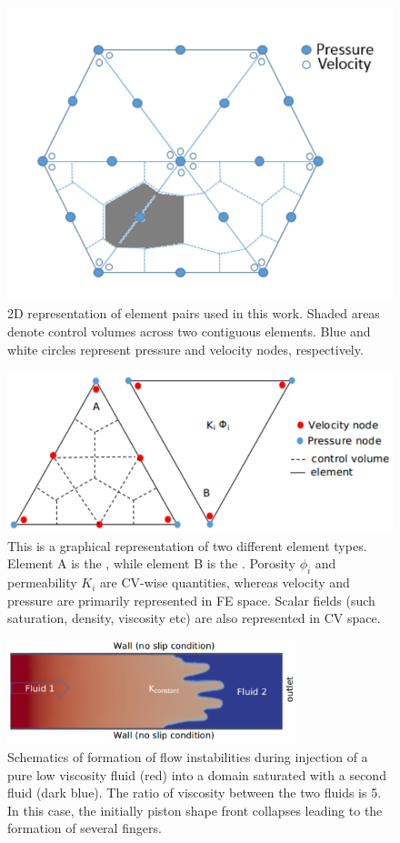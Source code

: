 
\begin{figure}[h]
\centering
\vbox{\includegraphics[width=.5\textwidth]{./Pics/P1DGP2.pdf}}
\caption{2D representation of  element pairs used in this work. Shaded areas denote control volumes across two contiguous elements. Blue and white circles represent pressure and velocity nodes, respectively.} 
\label{fig:fem_cv}
\end{figure}

\clearpage

\begin{figure}[h]
\centering
\vbox{\includegraphics[width=.75\textwidth]{./Pics/element_n.pdf}}
\caption{This is a graphical representation of two different element types. Element A is the , while element B is the . Porosity $\phi_{i}$ and permeability $K_{i}$ are CV-wise quantities, whereas velocity and pressure are primarily represented in FE space. Scalar fields (such saturation, density, viscosity etc) are also represented in CV space.}
\label{fig:fem_elem}
\end{figure}
\clearpage

\begin{figure}[h]
\centering
\vbox{\includegraphics[width=0.75\textwidth]{./Pics/phase_vol_frac_uni_perm_1.pdf}}
\caption{Schematics of formation of flow instabilities during injection of a pure low viscosity fluid (red) into a domain saturated with a second fluid (dark blue). The ratio of viscosity between the two fluids is 5. In this case, the initially piston shape front collapses leading to the formation of several fingers.}
\label{fig:simple_case}
\end{figure}
\clearpage


